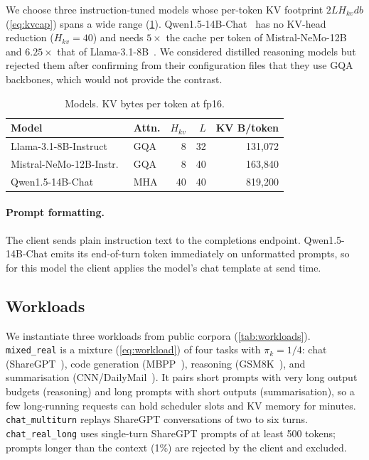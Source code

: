 We choose three instruction-tuned models whose per-token KV footprint
$2 L H_{kv} d b$ (\cref{eq:kvcap}) spans a wide range (\cref{tab:models}).
Qwen1.5-14B-Chat~\cite{bai2023qwen} has no KV-head reduction ($H_{kv}=40$) and needs $5\times$ the
cache per token of Mistral-NeMo-12B and $6.25\times$ that of Llama-3.1-8B~\cite{dubey2024llama3}.
We considered distilled reasoning models but rejected them after confirming from their
configuration files that they use GQA backbones, which would not provide the contrast.

\begin{table}[t]
  \caption{Models. KV bytes per token at fp16.}
  \label{tab:models}
  \small
  \begin{tabular}{@{}llrrr@{}}
    \toprule
    Model & Attn. & $H_{kv}$ & $L$ & KV B/token \\
    \midrule
    Llama-3.1-8B-Instruct & GQA & 8 & 32 & 131{,}072 \\
    Mistral-NeMo-12B-Instr.~\cite{mistralnemo} & GQA & 8 & 40 & 163{,}840 \\
    Qwen1.5-14B-Chat & MHA & 40 & 40 & 819{,}200 \\
    \bottomrule
  \end{tabular}
\end{table}

\paragraph{Prompt formatting.}
The client sends plain instruction text to the completions endpoint. Qwen1.5-14B-Chat emits its
end-of-turn token immediately on unformatted prompts, so for this model the client applies the
model's chat template at send time. 

\subsection{Workloads}
\label{sec:workloads}

We instantiate three workloads from public corpora (\cref{tab:workloads}).
\texttt{mixed\_real} is a mixture (\cref{eq:workload}) of four tasks with $\pi_k = 1/4$: chat
(ShareGPT~\cite{sharegpt}), code generation (MBPP~\cite{austin2021mbpp}), reasoning
(GSM8K~\cite{cobbe2021gsm8k}), and summarisation (CNN/DailyMail~\cite{hermann2015cnn}). It pairs
short prompts with very long output budgets (reasoning) and long prompts with short outputs
(summarisation), so a few long-running requests can hold scheduler slots and KV memory for
minutes. \texttt{chat\_multiturn} replays ShareGPT conversations of two to six turns.
\texttt{chat\_real\_long} uses single-turn ShareGPT prompts of at least 500 tokens; prompts longer
than the context (1\%) are rejected by the client and excluded.

